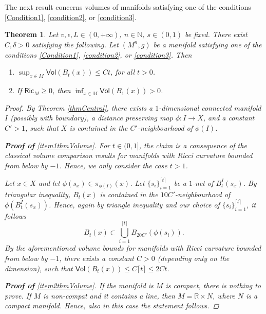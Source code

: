 \documentclass[10pt]{article}
\newtheorem{thm}{Theorem}[section]
\theoremstyle{definition}
\newcommand{\bb}[1]{\mathbb{#1}}
\newcommand{\ssf}[1]{\mathsf{#1}}
\newcommand{\Ric}{\mathsf{Ric}}
\begin{document}
 The next result concerns volumes of manifolds satisfying one of the conditions \eqref{Condition1}, \eqref{condition2}, or \eqref{condition3}.


\begin{thm} \label{thmVolume}
    Let $v,\epsilon,L \in (0,+\infty)$, $n \in \bb{N}$, $s \in (0,1)$ be fixed.
    There exist $C,\delta>0$ satisfying the following. Let $(M^n,g)$ be a manifold satisfying one of the conditions \eqref{Condition1}, \eqref{condition2}, or \eqref{condition3}. Then 
    \begin{enumerate}
    \item \label{item1thmVolume}
        $\sup_{x \in M} \ssf{Vol}(B_t(x)) \leq Ct$, for all $t>0$.
       \item \label{item2thmVolume}
       If $\Ric_M \geq 0$, then $\inf_{x \in M} \ssf{Vol}(B_1(x))>0$.
       \end{enumerate}
    \begin{proof}
    By Theorem \ref{thmCentral}, there exists a $1$-dimensional connected manifold $I$ (possibly with boundary), a distance preserving map $\phi:I \to X$, and a constant $C' >1$, such that $X$ is contained in the $C'$-neighbourhood of $\phi(I)$. 
    
        \textbf{Proof of} \ref{item1thmVolume}. 
        For $t \in (0,1]$, the claim is a consequence of the classical volume comparison results for manifolds with Ricci curvature bounded from below by $-1$. Hence, we only consider the case $t>1$.
        
        Let $x \in X$ and let $\phi(s_x) \in \pi_{\phi(I)}(x)$. Let $\{s_i\}_{i=1}^{\lceil t \rceil}$ be a $1$-net of $B^I_t(s_x)$. 
        By triangular inequality, $B_t(x)$ is contained in the $10C'$-neighbourhood of $\phi(B^I_t(s_x))$. Hence, again by triangle inequality and our choice of $\{s_i\}_{i=1}^{\lceil t \rceil}$, it follows
        \[
        B_t(x) \subset \bigcup_{i=1}^{\lceil t \rceil} B_{20C'}(\phi(s_i)).
        \]
        By the aforementioned volume bounds for manifolds with Ricci curvature bounded from below by $-1$, there exists a constant $C>0$ (depending only on the dimension), such that $\ssf{Vol}(B_t(x)) \leq C \lceil t \rceil \leq 2Ct$.  
    
    
    \textbf{Proof of} \ref{item2thmVolume}.
    If the manifold is $M$ is compact, there is nothing to prove. If $M$ is non-compat and it contains a line, then $M=\bb{R} \times N$, where $N$ is a compact manifold. Hence, also in this case the statement follows.
    

\end{proof}
\end{thm}
\end{document}
